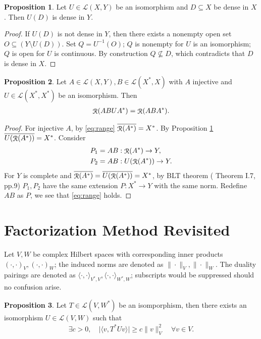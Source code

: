 \documentclass[a4paper,12pt]{article}
\theoremstyle{definition}
\newtheorem{prp}{Proposition}
\DeclareMathOperator\img{\EuScript{R}}
\begin{document}
\begin{prp}\label{thm:dense}
  Let $U\in\mathcal{L}(X, Y)$ be an isomorphism and $D\subseteq X$ be dense in $X$. Then $U(D)$ is dense in $Y$.
\end{prp}

\begin{proof}
  If $U(D)$ is not dense in $Y$, then there exists a nonempty open set $O\subseteq(Y\setminus U(D))$. Set $Q = U^{-1}(O)$; $Q$ is nonempty for $U$ is an isomorphism; $Q$ is open for $U$ is continuous. By construction $Q\not\subseteq D$, which contradicts that $D$ is dense in $X$.  
\end{proof}

\begin{prp}\label{thm:rangef}
  Let $A\in\mathcal{L}(X, Y), B\in\mathcal{L}(X^*, X)$ with $A$ injective and $U\in\mathcal{L}(X^*, X^*)$ be an isomorphism. Then
  \begin{align}\label{eq:rangef}
    \img(A B U A^*) = \img(A B A^*).
  \end{align}
\end{prp}

\begin{proof}
  For injective $A$, by \eqref{eq:range} $\overline{\img(A^*)}=X^*$. By Proposition \ref{thm:dense} $\overline{U(\img(A^*))}=X^*$. Consider 
  \begin{align*}
    P_1&=AB:\img(A^*)\to Y ,\\
    P_2&=AB:U(\img(A^*))\to Y. \\
  \end{align*}
  For $Y$ is complete and $\overline{\img(A^*)}=\overline{U(\img(A^*))}=X^*$, by BLT theorem (\citet{reed1} Theorem I.7, pp.9) $P_1, P_2$ have the same extension $P:X^*\to Y$ with the same norm. Redefine $AB$ as $P$, we see that \eqref{eq:range} holds.
\end{proof}

\section{Factorization Method Revisited}

Let $V, W$ be complex Hilbert spaces with corresponding inner products $(\cdot,\cdot)_V, (\cdot,\cdot)_W$; the induced norms are denoted as $\|\cdot\|_V, \|\cdot\|_W$. The duality pairings are denoted as $\langle \cdot, \cdot\rangle_{V^*, V}, \langle \cdot, \cdot\rangle_{W^*, W}$; subscripts would be suppressed should no confusion arise.

\begin{prp}\label{thm:coer}
  Let $T\in\mathcal{L}(V, W^*)$ be an isomporphism, then there exists an isomorphism $U\in\mathcal{L}(V, W)$ such that
  \begin{align}\label{eq:coer}
    \exists c > 0, \quad\bigl|\langle v, T^*Uv\rangle\bigr|\geqslant c\|v\|_V^2\quad\forall v\in V. 
  \end{align}
\end{prp}
\end{document}
